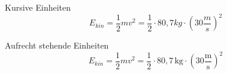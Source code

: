\documentclass[12pt,a5paper]{book}
\begin{document}
Kursive Einheiten
\begin{equation}
E_{kin} = \frac{1}{2}mv^2  = 
\frac{1}{2}\cdot 80,7kg \cdot \left(30\frac{m}{s}\right)^2
\end{equation}

Aufrecht stehende Einheiten
\begin{equation}
E_{kin} = \frac{1}{2}mv^2  = 
\frac{1}{2}\cdot 80,7\,\text{kg} \cdot 
\left(30\frac{\text{m}}{\text{s}}\right)^2 
\end{equation}
\end{document}
